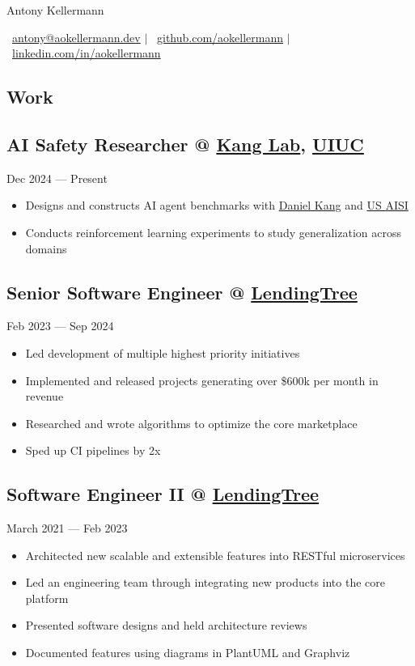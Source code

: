 \documentclass[11pt, letterpaper]{article}
\newcommand{\datedsubsection}[2]{
    \titleformat{\subsection}[runin]{\normalfont\normalsize\bfseries}{\thesection}{}{}
    \subsection*{#1}
    \hfill#2
    \titleformat{\subsection}[hang]{\normalfont\normalsize\bfseries}{\thesection}{}{}
}
\begin{document}
\pagestyle{empty}

\setlength{\parindent}{0pt}


\begin{center}
    \textcolor{header}{\huge{Antony Kellermann}}

    \bigskip

    \faEnvelope[regular]\ \href{mailto:antony@aokellermann.dev}{antony@aokellermann.dev}
    $|$
    \faGithub\ \href{https://github.com/aokellermann}{github.com/aokellermann}
    $|$
    \faLinkedinIn\ \href{https://linkedin.com/in/aokellermann}{linkedin.com/in/aokellermann}
\end{center}


\textcolor{header}{\section*{Work}}\label{sec:work}

\datedsubsection{AI Safety Researcher @ \href{https://ddkang.github.io/}{Kang Lab}, \href{https://illinois.edu/}{UIUC}}{Dec 2024 --- Present}
\begin{itemize}
    \item Designs and constructs AI agent benchmarks with \href{https://ddkang.github.io/}{Daniel Kang} and \href{https://www.nist.gov/aisi}{US AISI}
    \item Conducts reinforcement learning experiments to study generalization across domains
\end{itemize}

\datedsubsection{Senior Software Engineer @ \href{https://www.crunchbase.com/organization/lendingtree}{LendingTree}}{Feb 2023 --- Sep 2024}
\begin{itemize}
    \item Led development of multiple highest priority initiatives
    \item Implemented and released projects generating over \$600k per month in revenue
    \item Researched and wrote algorithms to optimize the core marketplace
    \item Sped up CI pipelines by 2x
\end{itemize}

\datedsubsection{Software Engineer II @ \href{https://www.crunchbase.com/organization/lendingtree}{LendingTree}}{March 2021 --- Feb 2023}
\begin{itemize}
    \item Architected new scalable and extensible features into RESTful microservices
    \item Led an engineering team through integrating new products into the core platform
    \item Presented software designs and held architecture reviews
    \item Documented features using diagrams in PlantUML and Graphviz
\end{itemize}
\end{document}
